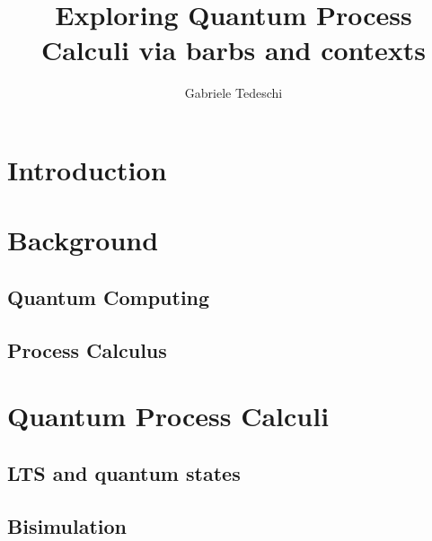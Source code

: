 \documentclass[10pt,a4paper, titlepage]{report}
\title{Exploring Quantum Process Calculi via barbs and contexts }
\author{Gabriele Tedeschi}
\theoremstyle{remark}
\begin{document}
\maketitle

\tableofcontents

\chapter{Introduction}

\chapter{Background}

\section{Quantum Computing}


\section{Process Calculus}

	





\chapter{Quantum Process Calculi}\label{chapter3}



\section{LTS and quantum states}


\section{Bisimulation}\label{stateOfTheAr_Bisimulation}

\end{document}

